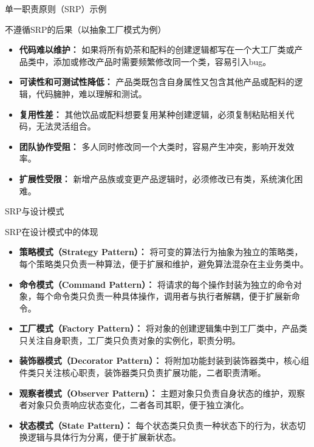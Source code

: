 \documentclass[UTF8,aspectratio=169]{beamer}
\begin{document}
\begin{frame}{单一职责原则（SRP）示例}
    \begin{alertytublock}{不遵循SRP的后果（以抽象工厂模式为例）}
        \begin{itemize}
            \item \textbf{代码难以维护：} 如果将所有奶茶和配料的创建逻辑都写在一个大工厂类或产品类中，添加或修改产品时需要频繁修改同一个类，容易引入bug。
            \item \textbf{可读性和可测试性降低：} 产品类既包含自身属性又包含其他产品或配料的逻辑，代码臃肿，难以理解和测试。
            \item \textbf{复用性差：} 其他饮品或配料想要复用某种创建逻辑，必须复制粘贴相关代码，无法灵活组合。
            \item \textbf{团队协作受阻：} 多人同时修改同一个大类时，容易产生冲突，影响开发效率。
            \item \textbf{扩展性受限：} 新增产品族或变更产品逻辑时，必须修改已有类，系统演化困难。
        \end{itemize}
    \end{alertytublock}
\end{frame}

\begin{frame}{SRP与设计模式}
    \begin{ytublock}{SRP在设计模式中的体现}
        \begin{itemize}
            \item \textbf{策略模式（Strategy Pattern）：} 将可变的算法行为抽象为独立的策略类，每个策略类只负责一种算法，便于扩展和维护，避免算法混杂在主业务类中。
            \item \textbf{命令模式（Command Pattern）：} 将请求的每个操作封装为独立的命令对象，每个命令类只负责一种具体操作，调用者与执行者解耦，便于扩展新命令。
            \item \textbf{工厂模式（Factory Pattern）：} 将对象的创建逻辑集中到工厂类中，产品类只关注自身职责，工厂类只负责对象的实例化，职责分明。
            \item \textbf{装饰器模式（Decorator Pattern）：} 将附加功能封装到装饰器类中，核心组件类只关注核心职责，装饰器类只负责扩展功能，二者职责清晰。
            \item \textbf{观察者模式（Observer Pattern）：} 主题对象只负责自身状态的维护，观察者对象只负责响应状态变化，二者各司其职，便于独立演化。
            \item \textbf{状态模式（State Pattern）：} 每个状态类只负责一种状态下的行为，状态切换逻辑与具体行为分离，便于扩展新状态。
        \end{itemize}
    \end{ytublock}
\end{frame}
\end{document}
